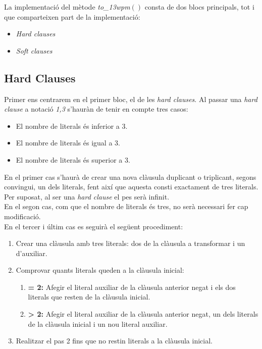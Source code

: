 \documentclass[../informe.tex]{subfiles}
\begin{document}
La implementació del mètode \textit{to\_13wpm$()$} consta de dos blocs principals, tot i que comparteixen part de la implementació:

\begin{itemize}
  \item \textit{Hard clauses}
  \item \textit{Soft clauses}
\end{itemize}



\subsection{Hard Clauses}
\label{subsection:hard_clauses}

Primer ens centrarem en el primer bloc, el de les \textit{hard clauses}. Al passar una \textit{hard clause} a notació \textit{1,3} s'hauràn de tenir en compte tres casos:
\begin{itemize}
  \item El nombre de literals és inferior a 3.
  \item El nombre de literals és igual a 3.
  \item El nombre de literals és superior a 3.
\end{itemize}

En el primer cas s'haurà de crear una nova clàusula duplicant o triplicant, segons convingui, un dels literals, fent així que aquesta consti exactament de tres literals. Per suposat, al ser una \textit{hard clause} el pes serà infinit.\\

En el segon cas, com que el nombre de literals és tres, no serà necessari fer cap modificació. \\

En el tercer i últim cas es seguirà el següent procediment:

\begin{enumerate}
  \item Crear una clàusula amb tres literals: dos de la clàusula a transformar i un d'auxiliar.
  \item Comprovar quants literals queden a la clàusula inicial:
        \begin{enumerate}
          \item \textbf{= 2: } Afegir el literal auxiliar de la clàusula anterior negat i els dos literals que resten de la clàusula inicial.
          \item \textbf{> 2: } Afegir el literal auxiliar de la clàusula anterior negat, un dels literals de la clàusula inicial i un nou literal auxiliar.
        \end{enumerate}
  \item Realitzar el pas 2 fins que no restin literals a la clàusula inicial.
\end{enumerate}
\end{document}
